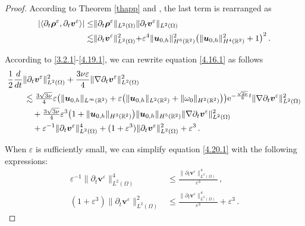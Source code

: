 \documentclass[pdflatex,sn-mathphys-num]{sn-jnl}%
\theoremstyle{thmstyleone}%
\theoremstyle{thmstyletwo}%
\theoremstyle{thmstylethree}%
\theoremstyle{thmstyletwo}
\begin{document}
\begin{proof}
	
	
	
	According to Theorem \ref{thapp} and , the last term is rearranged as
	\begin{align}\label{4.19.1}
		|\langle
		\partial_t\boldsymbol \rho^{\varepsilon}	,\partial_t{\boldsymbol v}^{\varepsilon}\rangle|
		\leq&
		\lVert
		\partial_t\boldsymbol{\rho}^\varepsilon\rVert_{{L}^{2}(\Omega)}
		\rVert
		\partial_t{\boldsymbol v}^{\varepsilon}
		\lVert_{{L}^2(\Omega)}
		\notag\\	
		\lesssim&
		\rVert
		\partial_t{\boldsymbol v}^{\varepsilon}
		\lVert^2_{{L}^2(\Omega)}
		+\varepsilon^4
		\lVert
		{\boldsymbol{u}}_{0,h}
		\rVert^2_{{H}^{6}(\mathbb{R}^2)}
		\big(
		\lVert
		{\boldsymbol{u}}_{0,h}
		\rVert^2_{{H}^{4}(\mathbb{R}^2)}
		+1
		\big)^2
		\,.
	\end{align}

	
	
	
	According to \eqref{3.2.1}-\eqref{4.19.1}, we can rewrite equation \eqref{4.16.1} as follows
	\begin{align}
		\label{4.20.1}
		&\frac{1}{2}\frac{d}{dt}\lVert\partial_t\boldsymbol v^{\varepsilon}\rVert^2_{{L}^2(\Omega)}
		+\frac{3\nu\varepsilon}{4}\lVert\nabla\partial_t\boldsymbol v^{\varepsilon}\rVert^2_{{L}^2(\Omega)}\notag\\
		&\qquad\lesssim
		\tfrac{3\sqrt{3\nu}}{4}
		\varepsilon
		\big(
		\lVert{\boldsymbol{u}}_{0,h}\rVert_{L^\infty(\mathbb{R}^2)} 
			+\varepsilon\big(
		\lVert{\boldsymbol{u}}_{0,h}\rVert_{L^2(\mathbb{R}^2)}+\lVert{\omega}_0\rVert_{H^2(\mathbb{R}^2)}
		\big)
		\big)\mathrm{e}^{-\frac{\sqrt{2\nu}}{8}  t}
		\lVert\nabla\partial_t{\boldsymbol v}^{\varepsilon}\rVert^2_{{L}^2(\Omega)}
		\notag\\
		&\qquad\quad+
		\tfrac{3\sqrt{3\nu}}{4}\varepsilon^3
		\big(
		1+
		\lVert {\boldsymbol{u}}_{0,h} \rVert_{H^{3}(\mathbb{R}^2)}
		\big)
		\lVert {\boldsymbol{u}}_{0,h} \rVert_{H^{5}(\mathbb{R}^2)}
		\lVert\nabla\partial_t{\boldsymbol v}^{\varepsilon}\rVert^2_{{L}^2(\Omega)}\notag\\
		&\qquad\quad
		+
		\varepsilon^{-1}\lVert
		\partial_t{\boldsymbol v}^{\varepsilon} 	\rVert^{4}_{{L}^2(\Omega)}
		+		(1+\varepsilon^{3})\lVert
		\partial_t{\boldsymbol v}^{\varepsilon} 	\rVert^{2}_{{L}^2(\Omega)}+
		\varepsilon^3
		\,.
	\end{align}
	
	
	
	When  $\varepsilon$ is sufficiently small, we can simplify equation \eqref{4.20.1} with the following expressions:
	\begin{align}
		 \varepsilon^{-1} \lVert
		\partial_t{\boldsymbol v}^{\varepsilon} 	\rVert^{4}_{{L}^2(\Omega)}&\leq
		\frac{
			\lVert
			\partial_t{\boldsymbol v}^{\varepsilon} 	\rVert^{4}_{{L}^2(\Omega)}
		}{
			\varepsilon^3 
		}\,,\label{1}\\
		(1+\varepsilon^{3} )\lVert
		\partial_t{\boldsymbol v}^{\varepsilon} 	\rVert^{2}_{{L}^2(\Omega)}&\leq
		\frac{
			\lVert
			\partial_t{\boldsymbol v}^{\varepsilon} 	\rVert^{4}_{{L}^2(\Omega)}
		}{
			\varepsilon^3 
		}
		+\varepsilon^3 \,.\label{2}
	\end{align}
	

\end{proof}
\end{document}
